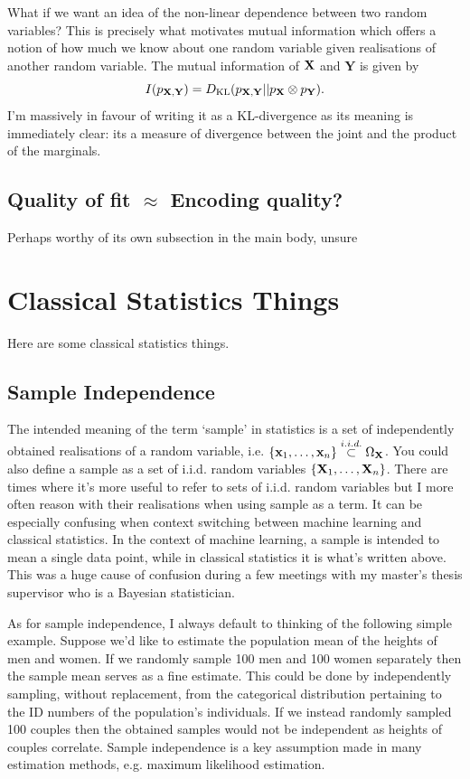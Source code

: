 \documentclass[11pt]{article}
\begin{document}
\begin{appendices}
What if we want an idea of the non-linear dependence between two random variables? This is precisely what motivates mutual information which offers a notion of how much we know about one random variable given realisations of another random variable. The mutual information of $\mathbf{X}$ and $\mathbf{Y}$ is given by
$$
I(p_{\mathbf{X},\mathbf{Y}})
=
D_{\text{KL}}(p_{\mathbf{X},\mathbf{Y}}||p_{\mathbf{X}}\otimes p_{\mathbf{Y}}).
$$
I'm massively in favour of writing it as a KL-divergence as its meaning is immediately clear: its a measure of divergence between the joint and the product of the marginals.

\subsection{Quality of fit $\approx$ Encoding quality?}
\TODO Perhaps worthy of its own subsection in the main body, unsure

\section{Classical Statistics Things}
Here are some classical statistics things.

\subsection{Sample Independence}
The intended meaning of the term `sample' in statistics is a set of independently obtained realisations of a random variable, i.e. $\{\mathbf{x}_1,\dots,\mathbf{x}_n\}\overset{i.i.d.}{\subset}\Omega_{\mathbf{X}}$. You could also define a sample as a set of i.i.d. random variables $\{\mathbf{X}_1,\dots,\mathbf{X}_n\}$. There are times where it's more useful to refer to sets of i.i.d. random variables but I more often reason with their realisations when using sample as a term. It can be especially confusing when context switching between machine learning and classical statistics. In the context of machine learning, a sample is intended to mean a single data point, while in classical statistics it is what's written above. This was a huge cause of confusion during a few meetings with my master's thesis supervisor who is a Bayesian statistician.

As for sample independence, I always default to thinking of the following simple example. Suppose we'd like to estimate the population mean of the heights of men and women. If we randomly sample 100 men and 100 women separately then the sample mean serves as a fine estimate. This could be done by independently sampling, without replacement, from the categorical distribution pertaining to the ID numbers of the population's individuals. If we instead randomly sampled 100 couples then the obtained samples would not be independent as heights of couples correlate. Sample independence is a key assumption made in many estimation methods, e.g. maximum likelihood estimation.


\end{appendices}
\end{document}
